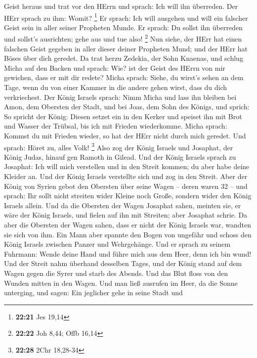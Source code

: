 Geist heraus und trat vor den HErrn und sprach: Ich will ihn überreden.
Der HErr sprach zu ihm: Womit? \footnote{\textbf{22:21} Jes 19,14}
 Er sprach: Ich will ausgehen und will ein falscher Geist
sein in aller seiner Propheten Munde. Er sprach: Du sollst ihn überreden
und sollst's ausrichten; gehe aus und tue also! \footnote{\textbf{22:22}
  Joh 8,44; Offb 16,14}  Nun siehe, der HErr hat einen
falschen Geist gegeben in aller dieser deiner Propheten Mund; und der
HErr hat Böses über dich geredet.  Da trat herzu Zedekia,
der Sohn Knaenas, und schlug Micha auf den Backen und sprach: Wie? ist
der Geist des HErrn von mir gewichen, dass er mit dir redete?
 Micha sprach: Siehe, du wirst's sehen an dem Tage, wenn du
von einer Kammer in die andere gehen wirst, dass du dich verkriechest.
 Der König Israels sprach: Nimm Micha und lass ihn bleiben
bei Amon, dem Obersten der Stadt, und bei Joas, dem Sohn des Königs,
 und sprich: So spricht der König: Diesen setzet ein in den
Kerker und speiset ihn mit Brot und Wasser der Trübsal, bis ich mit
Frieden wiederkomme.  Micha sprach: Kommst du mit Frieden
wieder, so hat der HErr nicht durch mich geredet. Und sprach: Höret zu,
alles Volk! \footnote{\textbf{22:28} 2Chr 18,28-34}  Also
zog der König Israels und Josaphat, der König Judas, hinauf gen Ramoth
in Gilead.  Und der König Israels sprach zu Josaphat: Ich
will mich verstellen und in den Streit kommen; du aber habe deine
Kleider an. Und der König Israels verstellte sich und zog in den Streit.
 Aber der König von Syrien gebot den Obersten über seine
Wagen -- deren waren 32 -- und sprach: Ihr sollt nicht streiten wider
Kleine noch Große, sondern wider den König Israels allein. 
Und da die Obersten der Wagen Josaphat sahen, meinten sie, er wäre der
König Israels, und fielen auf ihn mit Streiten; aber Josaphat schrie.
 Da aber die Obersten der Wagen sahen, dass er nicht der
König Israels war, wandten sie sich von ihm.  Ein Mann aber
spannte den Bogen von ungefähr und schoss den König Israels zwischen
Panzer und Wehrgehänge. Und er sprach zu seinem Fuhrmann: Wende deine
Hand und führe mich aus dem Heer, denn ich bin wund!  Und
der Streit nahm überhand desselben Tages, und der König stand auf dem
Wagen gegen die Syrer und starb des Abends. Und das Blut floss von den
Wunden mitten in den Wagen.  Und man ließ ausrufen im Heer,
da die Sonne unterging, und sagen: Ein jeglicher gehe in seine Stadt und
